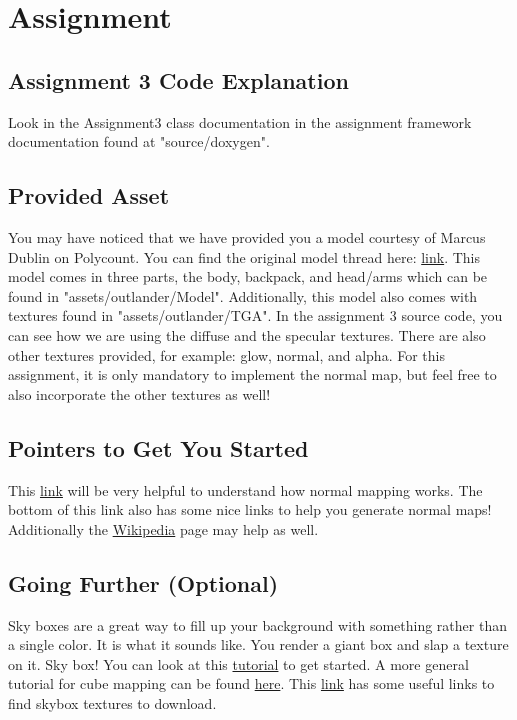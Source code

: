 \documentclass{article}
\begin{document}
\section*{Assignment}

\subsection*{Assignment 3 Code Explanation}

Look in the Assignment3 class documentation in the assignment framework documentation found at "source/doxygen".

\subsection*{Provided Asset}

You may have noticed that we have provided you a model courtesy of Marcus Dublin on Polycount. You can find the original model thread here: \href{http://www.polycount.com/forum/showpost.php?p=1589706&postcount=68}{link}. This model comes in three parts, the body, backpack, and head/arms which can be found in "assets/outlander/Model". Additionally, this model also comes with textures found in "assets/outlander/TGA". In the assignment 3 source code, you can see how we are using the diffuse and the specular textures. There are also other textures provided, for example: glow, normal, and alpha. For this assignment, it is only mandatory to implement the normal map, but feel free to also incorporate the other textures as well!

\subsection*{Pointers to Get You Started}
\begin{itemize*}
    \item This \href{http://www.opengl-tutorial.org/intermediate-tutorials/tutorial-13-normal-mapping/}{link} will be very helpful to understand how normal mapping works. The bottom of this link also has some nice links to help you generate normal maps! Additionally the \href{https://en.wikipedia.org/wiki/Normal_mapping}{Wikipedia} page may help as well.
\end{itemize*}

\subsection*{Going Further (Optional)}
\begin{itemize*}
    \item Sky boxes are a great way to fill up your background with something rather than a single color. It is what it sounds like. You render a giant box and slap a texture on it. Sky box! You can look at this \href{http://ogldev.atspace.co.uk/www/tutorial25/tutorial25.html}{tutorial} to get started. A more general tutorial for cube mapping can be found \href{http://learnopengl.com/#!Advanced-OpenGL/Cubemaps}{here}. This \href{http://answers.unity3d.com/questions/33102/where-can-i-download-skyboxes.html}{link} has some useful links to find skybox textures to download.
\end{itemize*}
\end{document}
